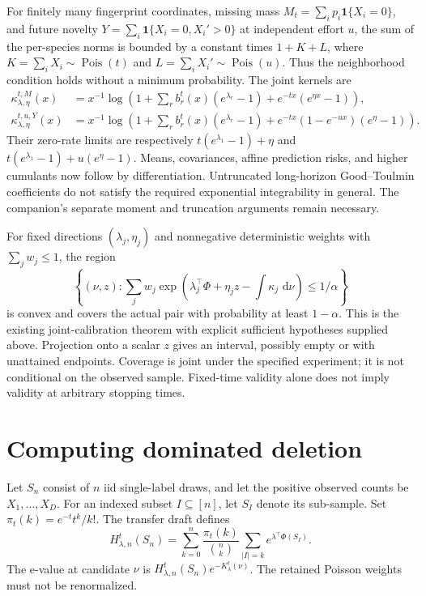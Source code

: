 \documentclass[11pt]{article}
\theoremstyle{remark}\newtheorem{remark}[theorem]{Remark}
\newcommand{\dd}{\,\mathrm d}\newcommand{\ind}{\mathbf1}
\newcommand{\Pois}{\operatorname{Pois}}
\begin{document}
For finitely many fingerprint coordinates, missing mass
$M_t=\sum_i p_i\ind\{X_i=0\}$, and future novelty
$Y=\sum_i\ind\{X_i=0,X_i'>0\}$ at independent effort $u$,
the sum of the per-species norms is bounded by a constant times
$1+K+L$, where $K=\sum_iX_i\sim\Pois(t)$ and
$L=\sum_iX_i'\sim\Pois(u)$. Thus the neighborhood condition holds
without a minimum probability.
The joint kernels are
\begin{align*}
 \kappa_{\lambda,\eta}^{t,M}(x)
 &=x^{-1}\log\!\left(1+\sum_r b_r^t(x)(e^{\lambda_r}-1)
                 +e^{-tx}(e^{\eta x}-1)\right),\\
 \kappa_{\lambda,\eta}^{t,u,Y}(x)
 &=x^{-1}\log\!\left(1+\sum_r b_r^t(x)(e^{\lambda_r}-1)
                 +e^{-tx}(1-e^{-ux})(e^\eta-1)\right).
\end{align*}
Their zero-rate limits are respectively
$t(e^{\lambda_1}-1)+\eta$ and
$t(e^{\lambda_1}-1)+u(e^\eta-1)$.
Means, covariances, affine prediction risks, and higher cumulants now follow
by differentiation. Untruncated long-horizon Good--Toulmin coefficients
do not satisfy the required exponential integrability in general.
The companion's separate moment and truncation arguments remain necessary.

For fixed directions $(\lambda_j,\eta_j)$ and nonnegative deterministic
weights with $\sum_j w_j\le1$, the region
\[
 \left\{(\nu,z):
 \sum_j w_j\exp\!\left(\lambda_j^\top\Phi+\eta_jz
                    -\int\kappa_j\,\dd\nu\right)\le1/\alpha\right\}
\]
is convex and covers the actual pair with probability at least $1-\alpha$.
This is the existing joint-calibration theorem with explicit sufficient
hypotheses supplied above. Projection onto a scalar $z$ gives an interval,
possibly empty or with unattained endpoints. Coverage is joint under the
specified experiment; it is not conditional on the observed sample.
Fixed-time validity alone does not imply validity at arbitrary stopping times.

\section{Computing dominated deletion}
Let $S_n$ consist of $n$ iid single-label draws, and let the positive
observed counts be $X_1,\ldots,X_D$.
For an indexed subset $I\subseteq[n]$, let $S_I$ denote its sub-sample.
Set $\pi_t(k)=e^{-t}t^k/k!$.
The transfer draft defines
\begin{equation}\label{eq:H}
 H_{\lambda,n}^t(S_n)=
 \sum_{k=0}^n\frac{\pi_t(k)}{\binom nk}
      \sum_{|I|=k} e^{\lambda^\top\Phi(S_I)}.
\end{equation}
The e-value at candidate $\nu$ is
$H_{\lambda,n}^t(S_n)e^{-K_\lambda^t(\nu)}$.
The retained Poisson weights must not be renormalized.
\end{document}
